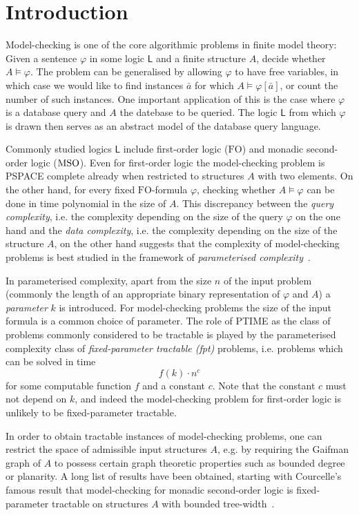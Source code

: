 \documentclass[12pt]{amsart}
\newcommand{\MSO}{\textrm{MSO}}
\newcommand{\FO}{\textrm{FO}}
\newcommand{\ssL}{\mathsf{L}}
\renewcommand{\MSO}{\textup{MSO}\xspace}
\begin{document}
\section{Introduction}
\label{sec:intro}

Model-checking is one of the core algorithmic problems in finite model
theory: Given a sentence $\varphi$ in some logic $\ssL$ and a finite
structure $A$, decide whether $A \models \varphi$. The problem can be
generalised by allowing $\varphi$ to have free variables, in which
case we would like to find instances $\bar a$ for which $A
\models \varphi[\bar a]$, or count the number of such
instances. One important application of this is the case where
$\varphi$ is a database query and $A$ the datebase to be queried. The
logic $\ssL$ from which $\varphi$ is drawn then serves as an abstract
model of the database query language.

Commonly studied logics $\ssL$ include first-order logic ($\FO$) and
monadic second-order logic ($\MSO$). Even for first-order logic the
model-checking problem is PSPACE complete already when restricted to
structures $A$ with two elements. On the other hand, for every fixed
$\FO$-formula $\varphi$, checking whether $A \models \varphi$ can be
done in time polynomial in the size of $A$. This discrepancy between
the \emph{query complexity}, i.e. the complexity depending on the size
of the query $\varphi$ on the one hand and the \emph{data complexity},
i.e. the complexity depending on the size of the structure $A$, on the
other hand suggests that the complexity of model-checking problems is
best studied in the framework of \emph{parameterised
  complexity}~\cite{DowneyF98,FlumG06}.

In parameterised complexity, apart from the size $n$ of the input
problem (commonly the length of an appropriate binary representation
of $\varphi$ and $A$) a \emph{parameter} $k$ is introduced. For
model-checking problems the size of the input formula is a common
choice of parameter. The role of PTIME as the class of problems
commonly considered to be tractable is played by the parameterised
complexity class of \emph{fixed-parameter tractable (fpt)} problems,
i.e. problems which can be solved in time
\[
f(k)\cdot n^c
\]
for some computable function $f$ and a constant $c$. Note that the
constant $c$ must not depend on $k$, and indeed the model-checking
problem for first-order logic is unlikely to be fixed-parameter
tractable.

In order to obtain tractable instances of model-checking problems, one
can restrict the space of admissible input structures $A$, e.g. by
requiring the Gaifman graph of $A$ to possess certain graph theoretic
properties such as bounded degree or planarity. A long list of results
have been obtained, starting with Courcelle's famous result that
model-checking for monadic second-order logic is fixed-parameter
tractable on structures $A$ with bounded
tree-width~\cite{Courcelle90}.
\end{document}
